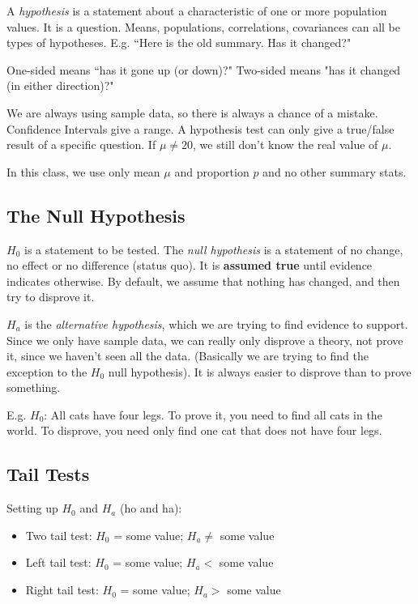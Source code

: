 \documentclass[11pt, oneside]{article}   	%
\begin{document}
A \textit{hypothesis} is a statement about a characteristic of one or more population values. It is a question. Means, populations, correlations, covariances can all be types of hypotheses. E.g. ``Here is the old summary. Has it changed?" 

One-sided means ``has it gone up (or down)?" Two-sided means "has it changed (in either direction)?"

We are always using sample data, so there is always a chance of a mistake. Confidence Intervals give a range. A hypothesis test can only give a true/false result of a specific question. If $\mu \neq 20$, we still don't know the real value of $\mu$.

In this class, we use only mean $\mu$ and proportion $p$ and no other summary stats.

\subsection{The Null Hypothesis}

$H_0$ is a statement to be tested. The \textit{null hypothesis} is a statement of no change, no effect or no difference (status quo). It is \textbf{assumed true} until evidence indicates otherwise. By default, we assume that nothing has changed, and then try to disprove it.

$H_a$ is the \textit{alternative hypothesis}, which we are trying to find evidence to support. Since we only have sample data, we can really only disprove a theory, not prove it, since we haven't seen all the data. (Basically we are trying to find the exception to the $H_0$ null hypothesis). It is always easier to disprove than to prove something.

E.g. $H_0$: All cats have four legs. To prove it, you need to find all cats in the world. To disprove, you need only find one cat that does not have four legs.

\subsection{Tail Tests}

Setting up $H_0$ and $H_a$ (ho and ha):
\begin{itemize}
\item{Two tail test: $H_0$ = some value; $H_a \neq$ some value}
\item{Left tail test:  $H_0$ = some value; $H_a <$ some value}
\item{Right tail test:  $H_0$ = some value; $H_a >$ some value}
\end{itemize}
\end{document}
